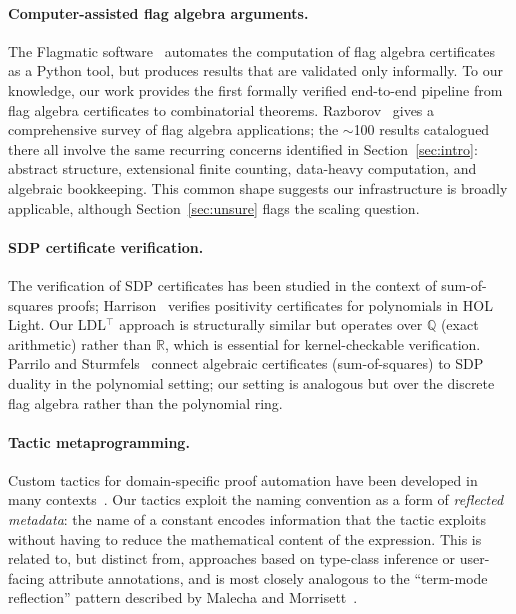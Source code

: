 \documentclass{article}
\begin{document}
\paragraph{Computer-assisted flag algebra arguments.}
The Flagmatic software~\cite{vaughan2013flagmatic} automates the computation
of flag algebra certificates as a Python tool, but produces results that
are validated only informally.  To our knowledge, our work provides the
first formally verified end-to-end pipeline from flag algebra certificates
to combinatorial theorems.  Razborov~\cite{razborov2013flag} gives a
comprehensive survey of flag algebra applications; the $\sim$100 results
catalogued there all involve the same recurring concerns identified in
Section~\ref{sec:intro}: abstract structure, extensional finite counting,
data-heavy computation, and algebraic bookkeeping.  This common shape
suggests our infrastructure is broadly applicable, although
Section~\ref{sec:unsure} flags the scaling question.

\paragraph{SDP certificate verification.}
The verification of SDP certificates has been studied in the context of
sum-of-squares proofs; Harrison~\cite{harrison2007verifying} verifies
positivity certificates for polynomials in HOL Light.  Our LDL$^\top$
approach is structurally similar but operates over $\mathbb{Q}$ (exact
arithmetic) rather than $\mathbb{R}$, which is essential for
kernel-checkable verification.  Parrilo and
Sturmfels~\cite{parrilo2003minimizing} connect algebraic certificates
(sum-of-squares) to SDP duality in the polynomial setting; our setting is
analogous but over the discrete flag algebra rather than the polynomial
ring.

\paragraph{Tactic metaprogramming.}
Custom tactics for domain-specific proof automation have been developed in
many contexts~\cite{ebner2017structured,sozeau2008coq}.  Our tactics exploit
the naming convention as a form of \emph{reflected metadata}: the name of a
constant encodes information that the tactic exploits without having to
reduce the mathematical content of the expression.  This is related to, but
distinct from, approaches based on type-class inference or user-facing
attribute annotations, and is most closely analogous to the ``term-mode
reflection'' pattern described by Malecha and
Morrisett~\cite{malecha2014towards}.
\end{document}
